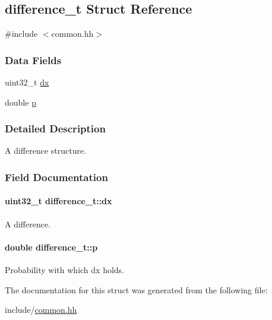 \hypertarget{structdifference__t}{\subsection{difference\-\_\-t \-Struct \-Reference}
\label{structdifference__t}
}


{\ttfamily \#include $<$common.\-hh$>$}

\subsubsection*{\-Data \-Fields}
\begin{DoxyCompactItemize}
\item 
uint32\-\_\-t \hyperlink{structdifference__t_a4ee58881816622d4f17c3adbd00a17e0}{dx}
\item 
double \hyperlink{structdifference__t_a1fb39340f84956fcc79adf44f61e1aa4}{p}
\end{DoxyCompactItemize}


\subsubsection{\-Detailed \-Description}
\-A difference structure. 

\subsubsection{\-Field \-Documentation}
\hypertarget{structdifference__t_a4ee58881816622d4f17c3adbd00a17e0}{
\paragraph[{dx}]{\setlength{\rightskip}{0pt plus 5cm}uint32\-\_\-t {\bf difference\-\_\-t\-::dx}}}\label{structdifference__t_a4ee58881816622d4f17c3adbd00a17e0}
\-A difference. \hypertarget{structdifference__t_a1fb39340f84956fcc79adf44f61e1aa4}{
\paragraph[{p}]{\setlength{\rightskip}{0pt plus 5cm}double {\bf difference\-\_\-t\-::p}}}\label{structdifference__t_a1fb39340f84956fcc79adf44f61e1aa4}
\-Probability with which dx holds. 

\-The documentation for this struct was generated from the following file\-:\begin{DoxyCompactItemize}
\item 
include/\hyperlink{common_8hh}{common.\-hh}\end{DoxyCompactItemize}
